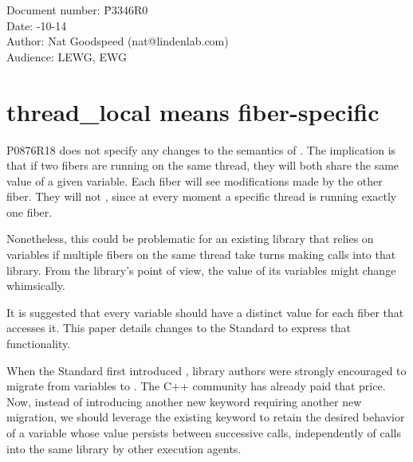 \documentclass[fontsize=10pt,paper=A4,pagesize,DIV=15]{scrartcl}
\begin{document}
\small
\begin{tabbing}
    Document number: \= P3346R0\\
    Date:            -10-14\\
    Author:          \> Nat Goodspeed (nat@lindenlab.com)\\
    Audience:        \> LEWG, EWG\\
\end{tabbing}

\section*{thread\_local means fiber-specific}


\tableofcontents


\label{abstract}

P0876R18\cite{P0876R18} does not specify any changes to the semantics of
. The implication is that
if two fibers are running on the same thread, they will both share the same
value of a given \tlocal variable. Each fiber will see modifications made by
the other fiber. They will not , since at every
moment a specific thread is running exactly one fiber.

Nonetheless, this could be problematic for an existing library that relies on
\tlocal variables if multiple fibers on the same thread take turns making
calls into that library. From the library's point of view, the value of its
\tlocal variables might change whimsically.

It is suggested that every \tlocal variable should have a distinct value for
each fiber that accesses it. This paper details changes to the
Standard\cite{Standard} to express that functionality. 

When the Standard first introduced \tlocal, library authors were strongly
encouraged to migrate from  variables to \tlocal. The C++
community has already paid that price. Now, instead of introducing another new
keyword requiring another new migration, we should leverage the existing
keyword to retain the desired behavior of a variable whose value persists
between successive calls, independently of calls into the same library by
other execution agents.
\end{document}

